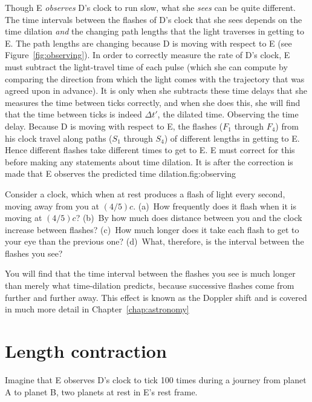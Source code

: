 Though E {\em observes\/} D's clock to run slow, what she {\em sees\/}
can be quite different.  The time intervals between the flashes of D's
clock that she sees depends on the time dilation {\em and\/} the
changing path lengths that the light traverses in getting to E.  The
path lengths are changing because D is moving with respect to E (see
Figure~\ref{fig:observing}).  In order to correctly measure the rate
of D's clock, E must subtract the light-travel time of each pulse
(which she can compute by comparing the direction from which the light
comes with the trajectory that was agreed upon in advance).  It is
only when she subtracts these time delays that she measures the time
between ticks correctly, and when she does this, she will find that
the time between ticks is indeed $\Delta t'$, the dilated time.
%
{Observing the time delay.  Because D is
moving with respect to E, the flashes ($F_1$ through $F_4$) from his
clock travel along paths ($S_1$ through $S_4$) of different lengths in
getting to E.  Hence different flashes take different times to get to
E.  E must correct for this before making any statements about time
dilation.  It is after the correction is made that E observes the
predicted time dilation.}{fig:observing}

\begin{problem}
Consider a clock, which when at rest produces a flash of light every
second, moving away from you at $(4/5)c$.  (a)~How frequently does it
flash when it is moving at $(4/5)c$?  (b)~By how much does distance
between you and the clock increase between flashes?  (c)~How much
longer does it take each flash to get to your eye than the previous
one?  (d)~What, therefore, is the interval between the flashes you
see?
\end{problem}

You will find that the time interval between the flashes you see is
much longer than merely what time-dilation predicts, because
successive flashes come from further and further away.  This effect is
known as the Doppler shift and is covered in much more detail in
Chapter~\ref{chap:astronomy}


\section{Length contraction}
\label{sec:lengthcontraction}

Imagine that E observes D's clock to tick 100 times during a journey
from planet A to planet B, two planets at rest in E's rest frame.

